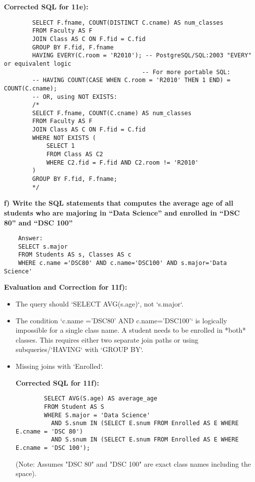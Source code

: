 \documentclass{article}
\begin{document}
\begin{enumerate}[label=\textbf{Question \arabic*.}]
\begin{itemize}
        \textbf{Corrected SQL for 11e):}
        \begin{lstlisting}
        SELECT F.fname, COUNT(DISTINCT C.cname) AS num_classes
        FROM Faculty AS F
        JOIN Class AS C ON F.fid = C.fid
        GROUP BY F.fid, F.fname
        HAVING EVERY(C.room = 'R2010'); -- PostgreSQL/SQL:2003 "EVERY" or equivalent logic
                                       -- For more portable SQL:
        -- HAVING COUNT(CASE WHEN C.room = 'R2010' THEN 1 END) = COUNT(C.cname);
        -- OR, using NOT EXISTS:
        /*
        SELECT F.fname, COUNT(C.cname) AS num_classes
        FROM Faculty AS F
        JOIN Class AS C ON F.fid = C.fid
        WHERE NOT EXISTS (
            SELECT 1
            FROM Class AS C2
            WHERE C2.fid = F.fid AND C2.room != 'R2010'
        )
        GROUP BY F.fid, F.fname;
        */
        \end{lstlisting}
    \end{itemize}

    \textbf{f) Write the SQL statements that computes the average age of all students who are majoring in “Data Science” and enrolled in “DSC 80” and “DSC 100”}
    \begin{lstlisting}
    Answer:
    SELECT s.major
    FROM Students AS s, Classes AS c
    WHERE c.name ='DSC80' AND c.name='DSC100' AND s.major='Data Science'
    \end{lstlisting}
    \textbf{Evaluation and Correction for 11f):}
    \begin{itemize}
        \item The query should `SELECT AVG(s.age)`, not `s.major`.
        \item The condition `c.name ='DSC80' AND c.name='DSC100'` is logically impossible for a single class name. A student needs to be enrolled in *both* classes. This requires either two separate join paths or using subqueries/`HAVING` with `GROUP BY`.
        \item Missing joins with `Enrolled`.

        \textbf{Corrected SQL for 11f):}
        \begin{lstlisting}
        SELECT AVG(S.age) AS average_age
        FROM Student AS S
        WHERE S.major = 'Data Science'
          AND S.snum IN (SELECT E.snum FROM Enrolled AS E WHERE E.cname = 'DSC 80')
          AND S.snum IN (SELECT E.snum FROM Enrolled AS E WHERE E.cname = 'DSC 100');
        \end{lstlisting}
        (Note: Assumes "DSC 80" and "DSC 100" are exact class names including the space).
    \end{itemize}


\end{enumerate}
\end{document}
